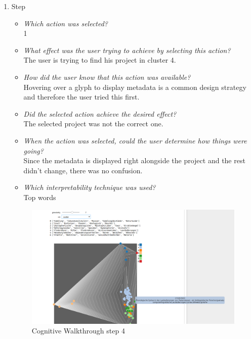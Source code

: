 {\begin{enumerate}
		\item Step
		\begin{itemize}
			\item \textit{Which action was selected?} \\
			1
			\item \textit{What effect was the user trying to achieve by selecting this action?} \\
			The user is trying to find his project in cluster 4. 
			\item \textit{How did the user know that this action was available?} \\
			Hovering over a glyph to display metadata is a common design strategy and therefore the user tried this first. 
			\item \textit{Did the selected action achieve the desired effect?} \\
			The selected project was not the correct one. 
			\item \textit{When the action was selected, could the user determine how things were going?} \\
			Since the metadata is displayed right alongside the project and the rest didn't change, there was no confusion.
			\item \textit{Which interpretability technique was used?}\\
			Top words
		\end{itemize}
		\begin{figure}[H]
			\centering
			\includegraphics[width=400px]{../chapters/validation/pics/3_c}
			\caption{\label{pic:step4} Cognitive Walkthrough step 4}
		\end{figure} \newpage
		

\end{enumerate}}
